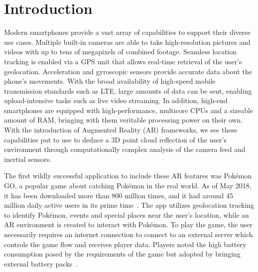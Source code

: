 \section{Introduction}
Modern smartphones provide a vast array of capabilities to support their diverse use cases.
Multiple built-in cameras are able to take high-resolution pictures and videos with up to tens of megapixels of combined footage. 
Seamless location tracking is enabled via a GPS unit that allows real-time retrieval of the user's geolocation.
Acceleration and gyroscopic sensors provide accurate data about the phone's movements.
With the broad availability of high-speed mobile transmission standards such as LTE, large amounts of data can be sent, enabling upload-intensive tasks such as live video streaming.
In addition, high-end smartphones are equipped with high-performance, multicore CPUs and a sizeable amount of RAM, bringing with them veritable processing power on their own.
With the introduction of Augmented Reality (AR) frameworks, we see these capabilities put to use to deduce a 3D point cloud reflection of the user's environment through computationally complex analysis of the camera feed and inertial sensors.

The first wildly successful application to include these AR features was Pokémon GO, a popular game about catching Pokémon in the real world.
As of May 2018, it has been downloaded more than 800 million times, and it had around 45 million daily active users in its prime time~\cite{PkmDownloads}.
The app utilizes geolocation tracking to identify Pokémon, events and special places near the user's location, while an AR environment is created to interact with Pokémon.
To play the game, the user necessarily requires an internet connection to connect to an external server which controls the game flow and receives player data.
Players noted the high battery consumption posed by the requirements of the game but adopted by bringing external battery packs~\cite{PkmBattery}.

